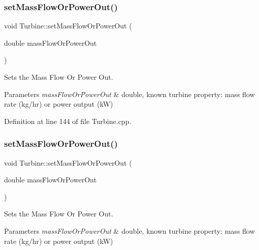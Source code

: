 \subsubsection{\texorpdfstring{set\+Mass\+Flow\+Or\+Power\+Out()}{setMassFlowOrPowerOut()}\hspace{0.1cm}{\footnotesize\ttfamily [2/3]}}
{\footnotesize\ttfamily void Turbine\+::set\+Mass\+Flow\+Or\+Power\+Out (\begin{DoxyParamCaption}\item[{double}]{mass\+Flow\+Or\+Power\+Out }\end{DoxyParamCaption})}



Sets the Mass Flow Or Power Out. 


\begin{DoxyParams}{Parameters}
{\em mass\+Flow\+Or\+Power\+Out} & double, known turbine property\+: mass flow rate (kg/hr) or power output (kW) \\
\hline
\end{DoxyParams}


Definition at line 144 of file Turbine.\+cpp.

\mbox{\label{class_turbine_a73522631e2eeefa8ea14d5b537e3e760}} 
\subsubsection{\texorpdfstring{set\+Mass\+Flow\+Or\+Power\+Out()}{setMassFlowOrPowerOut()}\hspace{0.1cm}{\footnotesize\ttfamily [3/3]}}
{\footnotesize\ttfamily void Turbine\+::set\+Mass\+Flow\+Or\+Power\+Out (\begin{DoxyParamCaption}\item[{double}]{mass\+Flow\+Or\+Power\+Out }\end{DoxyParamCaption})}



Sets the Mass Flow Or Power Out. 


\begin{DoxyParams}{Parameters}
{\em mass\+Flow\+Or\+Power\+Out} & double, known turbine property\+: mass flow rate (kg/hr) or power output (kW) \\
\hline
\end{DoxyParams}
\mbox{\label{class_turbine_ad5ff4ba1657aac9519a6841336ec571c}} 
